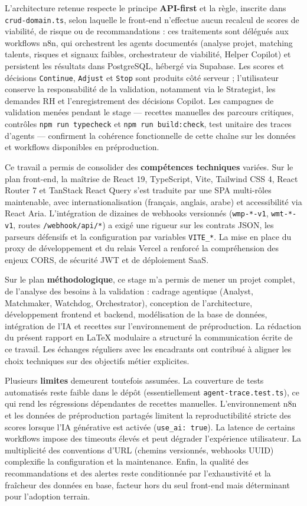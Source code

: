 L'architecture retenue respecte le principe \textbf{API-first} et la règle, inscrite dans \texttt{crud-domain.ts}, selon laquelle le front-end n'effectue aucun recalcul de scores de viabilité, de risque ou de recommandations : ces traitements sont délégués aux workflows n8n, qui orchestrent les agents documentés (analyse projet, matching talents, risques et signaux faibles, orchestrateur de viabilité, Helper Copilot) et persistent les résultats dans PostgreSQL, hébergé via Supabase. Les scores et décisions \texttt{Continue}, \texttt{Adjust} et \texttt{Stop} sont produits côté serveur ; l'utilisateur conserve la responsabilité de la validation, notamment via le Strategist, les demandes RH et l'enregistrement des décisions Copilot. Les campagnes de validation menées pendant le stage --- recettes manuelles des parcours critiques, contrôles \texttt{npm run typecheck} et \texttt{npm run build:check}, test unitaire des traces d'agents --- confirment la cohérence fonctionnelle de cette chaîne sur les données et workflows disponibles en préproduction.

Ce travail a permis de consolider des \textbf{compétences techniques} variées. Sur le plan front-end, la maîtrise de React 19, TypeScript, Vite, Tailwind CSS 4, React Router 7 et TanStack React Query s'est traduite par une SPA multi-rôles maintenable, avec internationalisation (français, anglais, arabe) et accessibilité via React Aria. L'intégration de dizaines de webhooks versionnés (\texttt{wmp-*-v1}, \texttt{wmt-*-v1}, routes \texttt{/webhook/api/*}) a exigé une rigueur sur les contrats JSON, les parseurs défensifs et la configuration par variables \texttt{VITE\_*}. La mise en place du proxy de développement et du relais Vercel a renforcé la compréhension des enjeux CORS, de sécurité JWT et de déploiement SaaS.

Sur le plan \textbf{méthodologique}, ce stage m'a permis de mener un projet complet, de l'analyse des besoins à la validation : cadrage agentique (Analyst, Matchmaker, Watchdog, Orchestrator), conception de l'architecture, développement frontend et backend, modélisation de la base de données, intégration de l'IA et recettes sur l'environnement de préproduction. La rédaction du présent rapport en LaTeX modulaire a structuré la communication écrite de ce travail. Les échanges réguliers avec les encadrants ont contribué à aligner les choix techniques sur des objectifs métier explicites.

Plusieurs \textbf{limites} demeurent toutefois assumées. La couverture de tests automatisés reste faible dans le dépôt (essentiellement \texttt{agent-trace.test.ts}), ce qui rend les régressions dépendantes de recettes manuelles. L'environnement n8n et les données de préproduction partagés limitent la reproductibilité stricte des scores lorsque l'IA générative est activée (\texttt{use\_ai: true}). La latence de certains workflows impose des timeouts élevés et peut dégrader l'expérience utilisateur. La multiplicité des conventions d'URL (chemins versionnés, webhooks UUID) complexifie la configuration et la maintenance. Enfin, la qualité des recommandations et des alertes reste conditionnée par l'exhaustivité et la fraîcheur des données en base, facteur hors du seul front-end mais déterminant pour l'adoption terrain.

